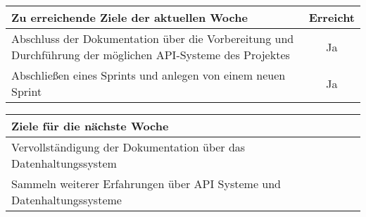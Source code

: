\begin{tabularx}{\textwidth}{Xc}
    \arrayrulecolor{OliveGreen}
    \toprule
    {\bfseries Zu erreichende Ziele der aktuellen Woche} & {\bfseries Erreicht} \\
    \midrule[2pt]
    Abschluss der Dokumentation über die Vorbereitung und Durchführung der
    möglichen API-Systeme des Projektes  &  Ja  \\
    \rowcolor{OliveGreen!15}
    Abschließen eines Sprints und anlegen von einem neuen Sprint  &  Ja  \\
    \bottomrule[2pt]
\end{tabularx}
%
\vspace{1cm}
%
\begin{tabularx}{\textwidth}{Xc}
    \arrayrulecolor{OliveGreen}
    \toprule
    {\bfseries Ziele für die nächste Woche}              &                      \\
    \midrule[2pt]
    Vervollständigung der Dokumentation über das Datenhaltungssystem  \\
    \rowcolor{OliveGreen!15}
    Sammeln weiterer Erfahrungen über API Systeme und Datenhaltungssysteme  \\
\end{tabularx}
